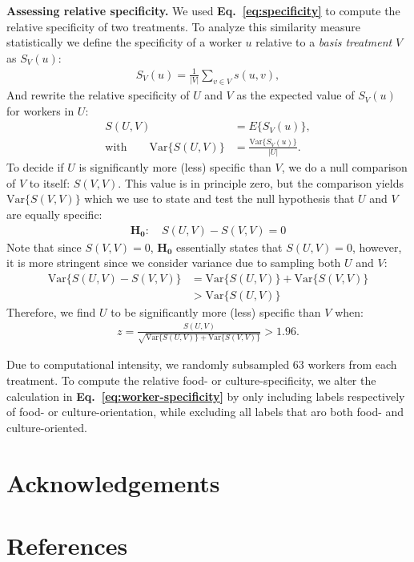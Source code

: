 \documentclass[a4paper]{report}
\begin{document}
\textbf{Assessing relative specificity.}
We used \textbf{Eq.~\ref{eq:specificity}} to compute the relative specificity
of two treatments.  To analyze this similarity measure statistically
we define the specificity of a worker $u$ relative to a 
\textit{basis treatment} $V$ as $S_V(u)$:
\begin{align}
S_V(u) = \frac{1}{|V|} \sum_{v \in V} s(u,v),
\end{align}
And rewrite the relative specificity of $U$ and $V$ as the expected value of
$S_V(u)$ for workers in $U$:
\begin{align}
	S(U,V) &= E\{S_V(u)\}, \\
	\text{with} \quad\quad \text{Var}\{S(U,V)\} 
		&= \frac{\text{Var}\{S_V(u)\}}{|U|}.
\end{align}
To decide if $U$ is significantly more (less) specific than $V$, we do
a null comparison of $V$ to itself: $S(V,V)$.  This value is in principle zero,
but the comparison yields $\text{Var}\{S(V,V)\}$ which we use to state and 
test the null hypothesis that $U$ and $V$ are equally specific:
\begin{align}
	\mathbf{H_0}: \quad S(U,V)-S(V,V)=0
\end{align}
Note that since $S(V,V)=0$, $\mathbf{H_0}$ essentially states that $S(U,V)=0$,
however, it is more stringent since we consider variance due to sampling both
$U$ and $V$:
\begin{align}
\text{Var}\{S(U,V) - S(V,V)\} &= \text{Var}\{S(U,V)\} + \text{Var}\{S(V,V)\}\\
						&> \text{Var}\{S(U,V)\}
\end{align}
Therefore, we find $U$ to be significantly more (less) specific than $V$ when:
\begin{align}
z = \frac{S(U,V)}{ \sqrt{ \text{Var}\{S(U,V)\} + \text{Var}\{S(V,V)\} }} 
	> 1.96.
\end{align}

Due to 
computational intensity, we randomly subsampled 63 workers from each treatment.
To compute the relative food- or culture-specificity, we alter the calculation
in \textbf{Eq.~\ref{eq:worker-specificity}} by only including labels 
respectively of food- or culture-orientation, while excluding all labels that
aro both food- and culture-oriented.



\section*{Acknowledgements}
\section*{References}
\begingroup
\renewcommand{\chapter}[2]{}

\endgroup
 
\end{document}
